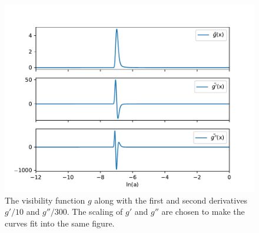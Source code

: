 \documentclass{aa}
\begin{document}
\begin{figure}[h!]
   \includegraphics[scale=0.5]{Figures/milestone_2/gtilde.pdf}
   \caption{The visibility function $g$ along with the first and second
    derivatives $g'/10$ and $g''/300$. The scaling of $g'$ and $g''$ are
    chosen to make the curves fit into the same figure.}\label{fig:M2_gtilde}
\end{figure}





\end{document}
